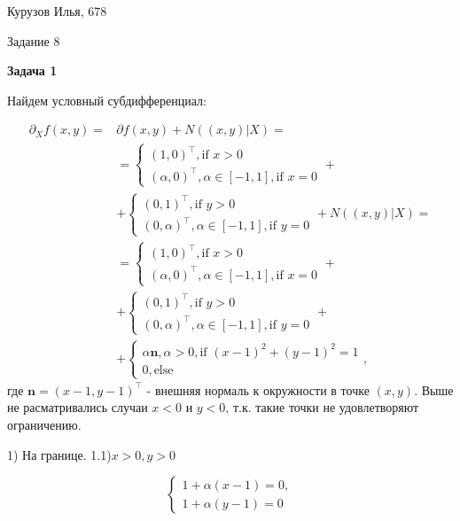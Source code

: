 \documentclass[12pt]{article}
\begin{document}
\begin{center}
	{Курузов Илья, 678}

	{Задание 8}
\end{center}

\begin{center}
	\textbf{Задача 1}
\end{center}

Найдем условный субдифференциал:

\begin{equation}
\begin{split}
\partial_X f(x,y) = &\partial f(x,y) + N((x,y)|X) = \\
&=\begin{cases}
(1, 0)^\top, \text{if $x > 0$}\\
(\alpha, 0)^\top, \alpha \in[-1,1], \text{if $x = 0$}
\end{cases} +\\
&+
\begin{cases}
(0, 1)^\top, \text{if $y > 0$}\\
(0, \alpha)^\top, \alpha \in[-1,1], \text{if $y = 0$}
\end{cases}
+N((x,y)|X)=\\
&=\begin{cases}
(1, 0)^\top, \text{if $x > 0$}\\
(\alpha, 0)^\top, \alpha \in[-1,1], \text{if $x = 0$}
\end{cases} +\\
&+
\begin{cases}
(0, 1)^\top, \text{if $y > 0$}\\
(0, \alpha)^\top, \alpha \in[-1,1], \text{if $y = 0$}
\end{cases}+\\
&+\begin{cases}
\alpha \textbf{n}, \alpha > 0, \text{if $(x-1)^2+(y-1)^2 =1$}\\
0, \text{else}
\end{cases},
\end{split}
\end{equation}
где $\textbf{n} = (x-1, y-1)^\top$ - внешняя нормаль к окружности  в точке $(x,y)$. Выше не расматривались случаи $x<0$ и $y<0$, т.к. такие точки не удовлетворяют ограничению.

1) На границе.
1.1)$x > 0, y > 0$

\begin{equation}
\begin{cases}
1 + \alpha(x-1)= 0,\\
1 + \alpha(y-1)= 0
\end{cases}
\end{equation}
\end{document}
